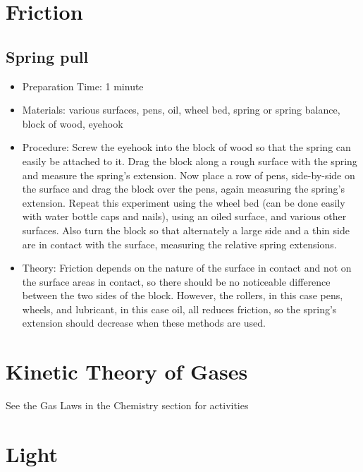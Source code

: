 \section{Friction}

\subsection{Spring pull}
\begin{itemize}
\item{Preparation Time: 1 minute}
\item{Materials: various surfaces, pens, oil, wheel bed, spring or spring balance, block of wood, eyehook}
\item{Procedure: Screw the eyehook into the block of wood so that the spring can easily be attached to it. Drag the block along a rough surface with the spring and measure the spring’s extension. Now place a row of pens, side-by-side on the surface and drag the block over the pens, again measuring the spring’s extension. Repeat this experiment using the wheel bed (can be done easily with water bottle caps and nails), using an oiled surface, and various other surfaces. Also turn the block so that alternately a large side and a thin side are in contact with the surface, measuring the relative spring extensions.}
\item{Theory: Friction depends on the nature of the surface in contact and not on the surface areas in contact, so there should be no noticeable difference between the two sides of the block. However, the rollers, in this case pens, wheels, and lubricant, in this case oil, all reduces friction, so the spring’s extension should decrease when these methods are used.}
\end{itemize}

\section{Kinetic Theory of Gases}
See the Gas Laws in the Chemistry section for activities

\section{Light}

